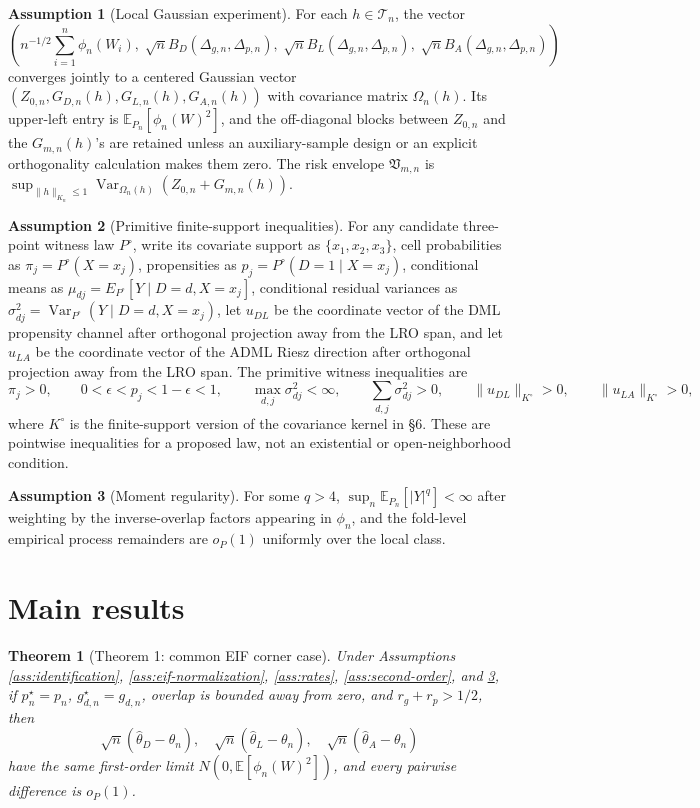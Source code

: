 \documentclass[11pt]{article}
\newcommand{\E}{\mathbb{E}}
\theoremstyle{definition}
\newtheorem{assumption}{Assumption}
\theoremstyle{plain}
\newtheorem{theorem}{Theorem}
\theoremstyle{remark}
\begin{document}
\begin{assumption}[Local Gaussian experiment]\label{ass:gaussian-experiment}
For each \(h\in\mathcal{T}_n\), the vector
\[
\left(n^{-1/2}\sum_{i=1}^n\phi_n(W_i),\;
\sqrt n B_D(\Delta_{g,n},\Delta_{p,n}),\;
\sqrt n B_L(\Delta_{g,n},\Delta_{p,n}),\;
\sqrt n B_A(\Delta_{g,n},\Delta_{p,n})\right)
\]
converges jointly to a centered Gaussian vector
\((Z_{0,n},G_{D,n}(h),G_{L,n}(h),G_{A,n}(h))\) with covariance matrix
\(\Omega_n(h)\).  Its upper-left entry is \(\E_{P_n}[\phi_n(W)^2]\), and the
off-diagonal blocks between \(Z_{0,n}\) and the \(G_{m,n}(h)\)'s are retained
unless an auxiliary-sample design or an explicit orthogonality calculation makes
them zero.  The risk envelope \(\mathfrak V_{m,n}\) is
\(\sup_{\|h\|_{K_n}\le1}\operatorname{Var}_{\Omega_n(h)}(Z_{0,n}+G_{m,n}(h))\).
\end{assumption}

\begin{assumption}[Primitive finite-support inequalities]\label{ass:primitive-open}
For any candidate three-point witness law \(P^\circ\), write its covariate
support as \(\{x_1,x_2,x_3\}\), cell probabilities as \(\pi_j=P^\circ(X=x_j)\),
propensities as \(p_j=P^\circ(D=1\mid X=x_j)\), conditional means as
\(\mu_{dj}=E_{P^\circ}[Y\mid D=d,X=x_j]\), conditional residual variances as
\(\sigma^2_{dj}=\operatorname{Var}_{P^\circ}(Y\mid D=d,X=x_j)\), let
\(u_{DL}\) be the coordinate vector of the DML propensity channel after
orthogonal projection away from the LRO span, and let \(u_{LA}\) be the
coordinate vector of the ADML Riesz direction after orthogonal projection away
from the LRO span.  The primitive witness
inequalities are
\[
\pi_j>0,\qquad 0<\epsilon<p_j<1-\epsilon<1,\qquad
\max_{d,j}\sigma^2_{dj}<\infty,\qquad
\sum_{d,j}\sigma^2_{dj}>0,\qquad
\|u_{DL}\|_{K^\circ}>0,\qquad
\|u_{LA}\|_{K^\circ}>0,
\]
where \(K^\circ\) is the finite-support version of the covariance kernel in
\S6.  These are pointwise inequalities for a proposed law, not an existential
or open-neighborhood condition.
\end{assumption}

\begin{assumption}[Moment regularity]\label{ass:moments}
For some \(q>4\), \(\sup_n\E_{P_n}[|Y|^q]<\infty\) after weighting by the
inverse-overlap factors appearing in \(\phi_n\), and the fold-level empirical
process remainders are \(o_P(1)\) uniformly over the local class.
\end{assumption}

\section{Main results}
\begin{theorem}[Theorem 1: common EIF corner case]\label{thm:common-eif}
Under Assumptions \ref{ass:identification}, \ref{ass:eif-normalization},
\ref{ass:rates}, \ref{ass:second-order}, and \ref{ass:moments}, if
\(p_n^\star=p_n\), \(g_{d,n}^\star=g_{d,n}\), overlap is bounded away from zero,
and \(r_g+r_p>1/2\), then
\[
\sqrt n(\hat\theta_D-\theta_n),\quad
\sqrt n(\hat\theta_L-\theta_n),\quad
\sqrt n(\hat\theta_A-\theta_n)
\]
have the same first-order limit \(N(0,\E[\phi_n(W)^2])\), and every pairwise
difference is \(o_P(1)\).
\end{theorem}
\end{document}
